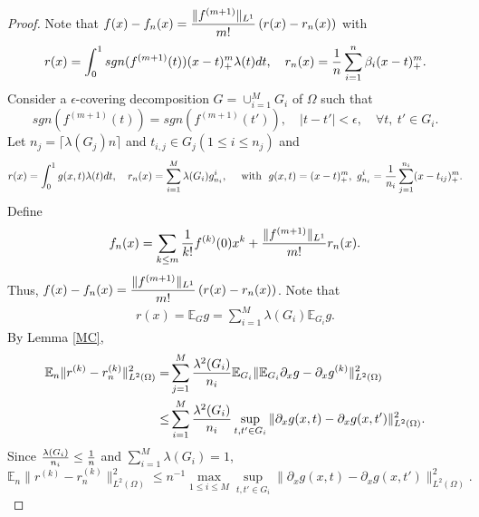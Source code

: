 \begin{proof}
Note that $\displaystyle f(x)-f_n(x)={ \|f^{(m+1)}\|_{L^1}\over m!}\left(r(x) - r_n(x)\right)$ with
\begin{equation}
r(x) = \int_0^1 sgn(f^{(m+1)}(t))(x-t)_+^m\lambda(t)dt,\quad r_n(x)= {1\over n}\sum_{i=1}^n\beta_i  (x-t)_+^m.
\end{equation}
Consider a $\epsilon$-covering decomposition $G=\cup_{i=1}^M G_i$ of $\Omega$ such that 
\begin{equation}
sgn(f^{(m+1)}(t))= sgn(f^{(m+1)}(t')), \quad |t-t'|<\epsilon, \quad \forall t,\ t'\in G_i.
\end{equation}
Let $n_j=\lceil \lambda(G_j)n\rceil$ and $t_{i,j} \in G_j(1\leq i\leq n_j)$ and 
\begin{equation}
r(x) = \int_0^1 g(x, t)\lambda(t)dt,\quad r_n(x)= \sum_{i=1}^M \lambda(G_i) g_{n_i}^i,\quad \mbox{ with }\ g(x, t)=(x-t)_+^m,\ g_{n_i}^i ={1\over n_i}  \sum_{j=1}^{n_i}(x-t_{ij})_+^m.
\end{equation}
Define
\begin{equation}
\begin{aligned}
f_n(x) = \sum_{k\le m}{1\over k!}f^{(k)}(0) x^k + { \|f^{(m+1)}\|_{L^1}\over m!}r_n(x).
\end{aligned}
\end{equation}
Thus, $\displaystyle f(x)-f_n(x)={ \|f^{(m+1)}\|_{L^1}\over m!}\left(r(x) - r_n(x)\right)$. Note that 
\begin{equation}
\begin{aligned}
r(x) = \mathbb{E}_G g =  \sum_{i=1}^{M}\lambda(G_i) \mathbb{E}_{G_i} g.
\end{aligned}
\end{equation}
By Lemma \ref{MC},
\begin{equation}
\begin{split}
\mathbb{E}_n\| r^{(k)} - r_n^{(k)} \|_{L^2(\Omega)}^2=& 
 \sum_{j=1}^{M}{\lambda^2(G_i) \over n_i}\mathbb{E}_{G_i}\|\mathbb{E}_{G_i} \partial_x g -  \partial_x g^{(k)}\|^2_{L^2(\Omega)}
\\
\le & \sum_{i=1}^{M} {\lambda^2(G_i)\over n_i}\sup_{t,t'\in G_i} \|\partial_x  g(x, t) - \partial_x g(x,t')\|^2_{L^2(\Omega)}.
\end{split}
\end{equation} 
Since ${\lambda(G_i)\over n_i}\le {1\over n}$ and $\displaystyle \sum_{i=1}^M \lambda(G_i)=1$,
\begin{equation}
\mathbb{E}_n\| r^{(k)} - r_n^{(k)} \|_{L^2(\Omega)}^2\leq n^{-1}\max_{1\le i\le M}\sup_{t,t'\in G_i} \| \partial_x g(x,t) - \partial_x g(x,t')\|^2_{L^2(\Omega)}.

\end{equation}
\end{proof}
